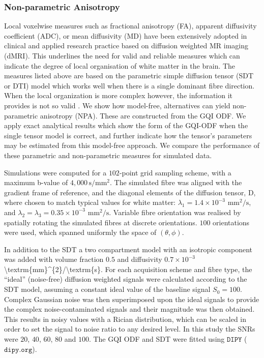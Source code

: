 \documentclass{bioinfo}
\begin{document}
\subsubsection{Non-parametric Anisotropy}

Local voxelwise measures such as fractional anisotropy (FA), apparent
diffusivity coefficient (ADC), or mean diffusivity (MD) have been
extensively adopted in clinical and applied research practice based
on diffusion weighted MR imaging (dMRI). This underlines the need
for valid and reliable measures which can indicate the degree of local
organisation of white matter in the brain. The measures listed above
are based on the parametric simple diffusion tensor (SDT or DTI) model
\citet{Basser1994BiophysicalJ} which works well when there is a single dominant
fibre direction. When the local organization is more complex however,
the information it provides is not so valid \citep{Yeh2010,Tuch2002ThesisMIT}.
We show how model-free, alternatives can yield non-parametric anisotropy
(NPA). These are constructed from the GQI ODF. We apply exact analytical
results which show the form of the GQI-ODF when the single tensor
model is correct, and further indicate how the tensor's parameters
may be estimated from this model-free approach. We compare the performance
of these parametric and non-parametric measures for simulated data.

Simulations were computed for a $102$-point grid sampling scheme,
with a maximum b-value of $4,000\,\textrm{s}/\textrm{mm}^{2}$. The
simulated fibre was aligned with the gradient frame of reference,
and the diagonal elements of the diffusion tensor, D, where chosen
to match typical values for white matter: $\lambda_{1}=1.4\times10^{-3}$
$\textrm{mm}^{2}/\textrm{s}$, and $\lambda_{2}=\lambda_{3}=0.35\times10^{-3}$
$\textrm{mm}^{2}/\textrm{s}$. Variable fibre orientation was realised
by spatially rotating the simulated fibres at discrete orientations.
$100$ orientations were used, which spanned uniformly the space of
$(\theta,\phi)$. 

In addition to the SDT a two compartment model with an isotropic component
was added with volume fraction $0.5$ and diffusivity $0.7\times10^{-3}$
\foreignlanguage{british}{\textbackslash{}textrm\{mm\}\textasciicircum{}\{2\}/\textbackslash{}textrm\{s\}}.
For each acquisition scheme and fibre type, the \textquotedblleft{}ideal\textquotedblright{}
(noise-free) diffusion weighted signals were calculated according
to the SDT model, assuming a constant ideal value of the baseline
signal $S_{0}=100$. Complex Gaussian noise was then superimposed
upon the ideal signals to provide the complex noise-contaminated signals
and their magnitude was then obtained. This results in noisy values
with a Rician distribution, which can be scaled in order to set the
signal to noise ratio to any desired level. In this study the SNRs
were $20$, $40$, $60$, $80$ and $100$. The GQI ODF and SDT were
fitted using $\texttt{DIPY}$ ($\texttt{dipy.org}$). 
\end{document}
